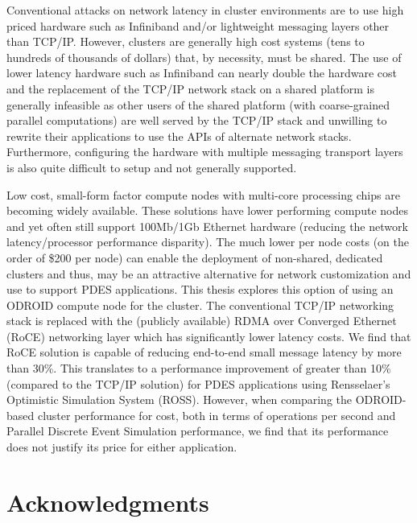 \documentclass[11pt]{book}
\begin{document}
Conventional attacks on network latency in cluster environments are to use high priced
hardware such as Infiniband and/or lightweight messaging layers other than TCP/IP.
However, clusters are generally high cost systems (tens to hundreds of thousands of dollars)
that, by necessity, must be shared.  The use of lower latency hardware such as Infiniband
can nearly double the hardware cost and the replacement of the TCP/IP network stack on a
shared platform is generally infeasible as other users of the shared platform (with
coarse-grained parallel computations) are well served by the TCP/IP stack and unwilling to
rewrite their applications to use the APIs of alternate network stacks.  Furthermore,
configuring the hardware with multiple messaging transport layers is also quite difficult
to setup and not generally supported.

Low cost, small-form factor compute nodes with multi-core processing chips are becoming
widely available.  These solutions have lower performing compute nodes and yet often still
support 100Mb/1Gb Ethernet hardware (reducing the network latency/processor performance
disparity).  The much lower per node costs (on the order of \$200 per node) can enable the
deployment of non-shared, dedicated clusters and thus, may be an attractive alternative
for network customization and use to support PDES applications.  This thesis explores this
option of using an ODROID compute node for the cluster.  The conventional TCP/IP
networking stack is replaced with the (publicly available) RDMA over Converged Ethernet
(RoCE) networking layer which has significantly lower latency costs.  We find that RoCE
solution is capable of reducing end-to-end small message latency by more than 30\%.  This
translates to a performance improvement of greater than 10\% (compared to the TCP/IP
solution) for PDES applications using Rensselaer's Optimistic Simulation System (ROSS).
However, when comparing the ODROID-based cluster performance for cost, both in terms of
operations per second and Parallel Discrete Event Simulation performance, we find that its
performance does not justify its price for either application.

\chapter*{Acknowledgments}


\tableofcontents \markright{ }
\listoffigures \markright{ }
\listoftables \markright{ }
\end{document}
